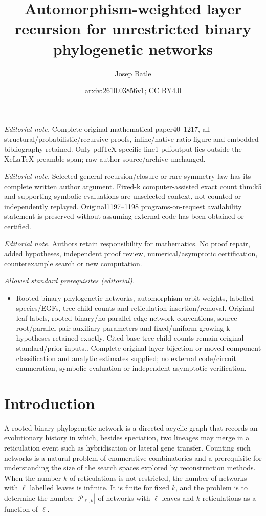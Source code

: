\documentclass[11pt,a4paper]{article}
\title{Automorphism-weighted layer recursion for unrestricted binary phylogenetic networks}
\author{Josep Batle}
\date{arxiv:2610.03856v1; CC BY4.0}
\theoremstyle{definition}
\newcommand{\cP}{\mathcal{P}}
\begin{document}
\maketitle
\noindent\textit{Editorial note.} Complete original mathematical paper40--1217, all structural/probabilistic/recursive proofs, inline/native ratio figure and embedded bibliography retained. Only pdfTeX-specific line1 pdfoutput lies outside the XeLaTeX preamble span; raw author source/archive unchanged.\par\medskip
\noindent\textit{Editorial note.} Selected general recursion/closure or rare-symmetry law has its complete written author argument. Fixed-k computer-assisted exact count thm:k5 and supporting symbolic evaluations are unselected context, not counted or independently replayed. Original1197--1198 programs-on-request availability statement is preserved without assuming external code has been obtained or certified.\par\medskip
\noindent\textit{Editorial note.} Authors retain responsibility for mathematics. No proof repair, added hypotheses, independent proof review, numerical/asymptotic certification, counterexample search or new computation.\par\medskip
\noindent\textit{Allowed standard prerequisites (editorial).}\begin{itemize}
\item Rooted binary phylogenetic networks, automorphism orbit weights, labelled species/EGFs, tree-child counts and reticulation insertion/removal. Original leaf labels, rooted binary/no-parallel-edge network conventions, source-root/parallel-pair auxiliary parameters and fixed/uniform growing-k hypotheses retained exactly. Cited base tree-child counts remain original standard/prior inputs.. Complete original layer-bijection or moved-component classification and analytic estimates supplied; no external code/circuit enumeration, symbolic evaluation or independent asymptotic verification.
\end{itemize}\medskip
\section{Introduction}\label{sec:intro}

A rooted binary phylogenetic network is a directed acyclic graph that records an evolutionary history in which, besides speciation, two lineages may merge in a reticulation event such as hybridisation or lateral gene transfer. Counting such networks is a natural problem of enumerative combinatorics and a prerequisite for understanding the size of the search spaces explored by reconstruction methods. When the number $k$ of reticulations is not restricted, the number of networks with $\ell$ labelled leaves is infinite. It is finite for fixed $k$, and the problem is to determine the number $|\cP_{\ell,k}|$ of networks with $\ell$ leaves and $k$ reticulations as a function of $\ell$.
\end{document}

